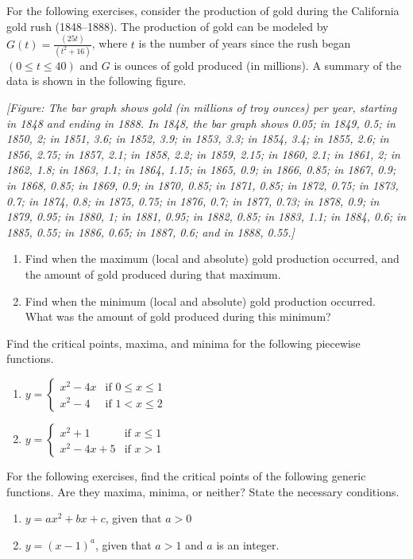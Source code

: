 \documentclass{exercises}
\begin{document}
For the following exercises, consider the production of gold during the California gold rush (1848--1888). The production of gold can be modeled by $G(t)=\frac{(25t)}{(t^{2}+16)}$, where $t$ is the number of years since the rush began $(0\le t\le40)$ and $G$ is ounces of gold produced (in millions). A summary of the data is shown in the following figure.


\textit{[Figure: The bar graph shows gold (in millions of troy ounces) per year, starting in 1848 and ending in 1888. In 1848, the bar graph shows 0.05; in 1849, 0.5; in 1850, 2; in 1851, 3.6; in 1852, 3.9; in 1853, 3.3; in 1854, 3.4; in 1855, 2.6; in 1856, 2.75; in 1857, 2.1; in 1858, 2.2; in 1859, 2.15; in 1860, 2.1; in 1861, 2; in 1862, 1.8; in 1863, 1.1; in 1864, 1.15; in 1865, 0.9; in 1866, 0.85; in 1867, 0.9; in 1868, 0.85; in 1869, 0.9; in 1870, 0.85; in 1871, 0.85; in 1872, 0.75; in 1873, 0.7; in 1874, 0.8; in 1875, 0.75; in 1876, 0.7; in 1877, 0.73; in 1878, 0.9; in 1879, 0.95; in 1880, 1; in 1881, 0.95; in 1882, 0.85; in 1883, 1.1; in 1884, 0.6; in 1885, 0.55; in 1886, 0.65; in 1887, 0.6; and in 1888, 0.55.]}

\begin{enumerate}[resume]
\item Find when the maximum (local and absolute) gold production occurred, and the amount of gold produced during that maximum.
\item Find when the minimum (local and absolute) gold production occurred. What was the amount of gold produced during this minimum?
\end{enumerate}

Find the critical points, maxima, and minima for the following piecewise functions.

\begin{enumerate}[resume]
\item $y=\begin{cases}x^{2}-4x & \text{if }0\le x\le1 \\ x^{2}-4 & \text{if }1<x\le2\end{cases}$
\item $y=\begin{cases}x^{2}+1 & \text{if }x\le1 \\ x^{2}-4x+5 & \text{if }x>1\end{cases}$
\end{enumerate}

For the following exercises, find the critical points of the following generic functions. Are they maxima, minima, or neither? State the necessary conditions.

\begin{enumerate}[resume]
\item $y=ax^{2}+bx+c$, given that $a>0$
\item $y={(x-1)}^{a}$, given that $a>1$ and $a$ is an integer.
\end{enumerate}
\end{document}
